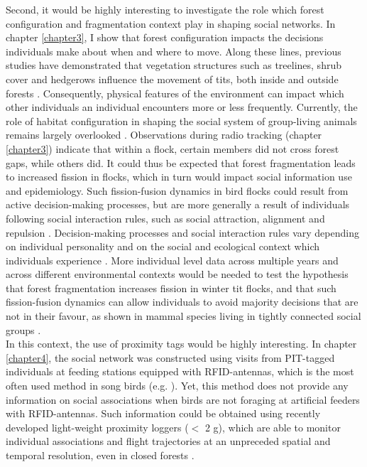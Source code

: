 \documentclass[10pt, twoside]{book} %
\begin{document}
Second, it would be highly interesting to investigate the role which forest configuration and fragmentation context play in shaping social networks. In chapter \ref{chapter3}, I show that forest configuration impacts the decisions individuals make about when and where to move. Along these lines, previous studies have demonstrated that vegetation structures such as treelines, shrub cover and hedgerows influence the movement of tits, both inside \citep{Farine2016} and outside forests \citep{Cox2016}. Consequently, physical features of the environment can impact which other individuals an individual encounters more or less frequently. Currently, the role of habitat configuration in shaping the social system of group-living animals remains largely overlooked \citep{He2019}. Observations during radio tracking (chapter \ref{chapter3}) indicate that within a flock, certain members did not cross forest gaps, while others did. It could thus be expected that forest fragmentation leads to increased fission in flocks, which in turn would impact social information use and epidemiology. Such fission-fusion dynamics in bird flocks could result from active decision-making processes, but are more generally a result of individuals following social interaction rules, such as social attraction, alignment and repulsion \citep{Couzin2003, Silk2014}. Decision-making processes and social interaction rules vary depending on individual personality \citep{Couzin2003} and on the social and ecological context which individuals experience \citep{Hoare2004}. More individual level data across multiple years and across different environmental contexts would be needed to test the hypothesis that forest fragmentation increases fission in winter tit flocks, and that such fission-fusion dynamics can allow individuals to avoid majority decisions that are not in their favour, as shown in mammal species living in tightly connected social groups \citep{Kerth2006, Stueckle2008}.\\

In this context, the use of proximity tags would be highly interesting. In chapter \ref{chapter4}, the social network was constructed using visits from PIT-tagged individuals at feeding stations equipped with RFID-antennas, which is the most often used method in song birds (e.g. \citealt{Boogert2014, Aplin2015, Farine2015b, Moyers2018}). Yet, this method does not provide any information on social associations when birds are not foraging at artificial feeders with RFID-antennas. Such information could be obtained using recently developed light-weight proximity loggers ($<$ 2 g), which are able to monitor individual associations and flight trajectories at an unpreceded spatial and temporal resolution, even in closed forests \citep{Ripperger2016, Ripperger2020}. 
\end{document}
